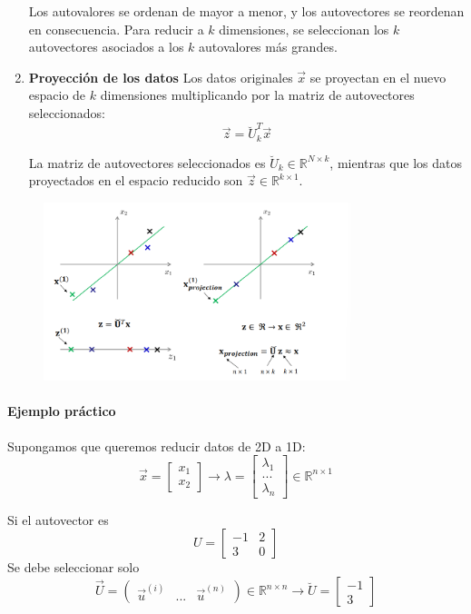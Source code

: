 \begin{enumerate}
Los autovalores se ordenan de mayor a menor, y los autovectores se reordenan en consecuencia.
Para reducir a $k$ dimensiones, se seleccionan los $k$ autovectores asociados a los $k$ autovalores más grandes.

\item \textbf{Proyección de los datos}
Los datos originales $\vec{x}$ se proyectan en el nuevo espacio de $k$ dimensiones multiplicando por la matriz de autovectores seleccionados:
$$\vec{z} = \breve{U}^T_k \vec{x}$$

La matriz de autovectores seleccionados es $\breve{U}_k \in \mathbb{R}^{N \times k}$, mientras que los datos proyectados en el espacio reducido son $\vec{z} \in \mathbb{R}^{k \times 1}$.
\end{enumerate}

\begin{figure}[h]
\centering
\includegraphics[width = 0.8\textwidth]{figs/resumen-PCA.png}
\end{figure}

\paragraph{Ejemplo práctico} Supongamos que queremos reducir datos de 2D a 1D:
$$\vec{x} = \begin{bmatrix}
x_1 \\ x_2
\end{bmatrix}
\rightarrow
\lambda = \begin{bmatrix}
\lambda_1 \\ ... \\ \lambda_n
\end{bmatrix} \in \mathbb{R}^{n \times 1}$$

Si el autovector es
$$U = \begin{bmatrix}
-1 & 2 \\ 
3 & 0
\end{bmatrix}$$
Se debe seleccionar solo
$$\vec{U} = \begin{pmatrix}
\vec{u}^{(i)} & ... & \vec{u}^{(n)}
\end{pmatrix} \in \mathbb{R}^{n \times n} 
\rightarrow
\breve{U} = \begin{bmatrix}
-1 \\ 3
\end{bmatrix}$$

